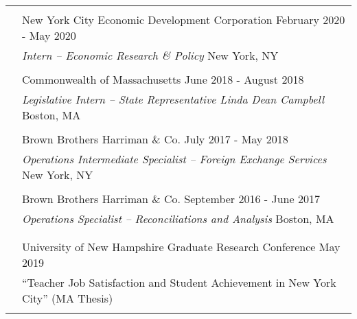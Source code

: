 \documentclass[letterpaper, 11pt]{article}
\begin{document}
\begin{longtable}{p{0.1in}p{5.9in}}

\multicolumn{2}{l}{\color{Maroon}{INDUSTRY EXPERIENCE}}\\

& New York City Economic Development Corporation \hfill February 2020 - May 2020 \\
& {\sl Intern -- Economic Research \& Policy} \hfill New York, NY\\ & \\

& Commonwealth of Massachusetts \hfill June 2018 - August 2018 \\
& {\sl Legislative Intern -- State Representative Linda Dean Campbell} \hfill Boston, MA\\ & \\

& Brown Brothers Harriman \& Co. \hfill July 2017 - May 2018 \\
& {\sl Operations Intermediate Specialist – Foreign Exchange Services} \hfill New York, NY \\ & \\

& Brown Brothers Harriman \& Co. \hfill September 2016 - June 2017 \\
& {\sl Operations Specialist – Reconciliations and Analysis} \hfill Boston, MA \\ & \\


{\color{Maroon}{PRESENTATIONS}} \\

& University of New Hampshire Graduate Research Conference \hfill May 2019 \\
& \hspace{10pt} “Teacher Job Satisfaction and Student Achievement in New York City” (MA Thesis) \\ & \\


\end{longtable}
\end{document}
